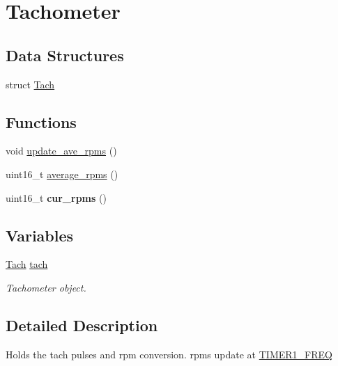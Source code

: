 \hypertarget{group__tacho}{\section{Tachometer}
\label{group__tacho}
}
\subsection*{Data Structures}
\begin{DoxyCompactItemize}
\item 
struct \hyperlink{struct_tach}{Tach}
\end{DoxyCompactItemize}
\subsection*{Functions}
\begin{DoxyCompactItemize}
\item 
void \hyperlink{group__tacho_ga8746e3cc762f3153c2889e07dbb6ece0}{update\-\_\-ave\-\_\-rpms} ()
\item 
uint16\-\_\-t \hyperlink{group__tacho_gaa71ed50a06812b35c553b2291460396e}{average\-\_\-rpms} ()
\item 
\hypertarget{group__tacho_ga962c04c1da2810dd1602a83f649a454e}{uint16\-\_\-t {\bfseries cur\-\_\-rpms} ()}\label{group__tacho_ga962c04c1da2810dd1602a83f649a454e}

\end{DoxyCompactItemize}
\subsection*{Variables}
\begin{DoxyCompactItemize}
\item 
\hypertarget{group__tacho_ga3920911d3598cb499db825e8cb9adcad}{\hyperlink{struct_tach}{Tach} \hyperlink{group__tacho_ga3920911d3598cb499db825e8cb9adcad}{tach}}\label{group__tacho_ga3920911d3598cb499db825e8cb9adcad}

\begin{DoxyCompactList}\small\item\em Tachometer object. \end{DoxyCompactList}\end{DoxyCompactItemize}


\subsection{Detailed Description}
Holds the tach pulses and rpm conversion. {\ttfamily rpms} update at \hyperlink{defines_8h_a2f78c07e3b43ef498e926a39eff06b04}{T\-I\-M\-E\-R1\-\_\-\-F\-R\-E\-Q} 

